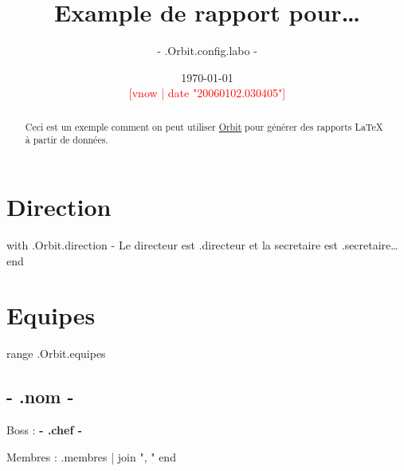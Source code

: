 \documentclass[11pt,twoside,openright]{report} %
\title{Example de rapport pour\dots}
\author{ {{- .Orbit.config.labo -}} }
\date{%
\today\\\bigskip%
\small\textcolor{red}{[v{{now | date "20060102.030405"}}]}%
}
\begin{document}
\maketitle

\begin{abstract}
  Ceci est un exemple comment on peut utiliser \href{https://github.com/gulien/orbit}{Orbit} pour générer des rapports \LaTeX{} à partir de données.
\end{abstract}



\section{Direction}

{{with .Orbit.direction -}}
  Le directeur est {{.directeur}} et la secretaire est {{.secretaire}}\dots
{{end}}

\section{Equipes}

{{range .Orbit.equipes}}
  \subsection{ {{- .nom -}} }

  Boss : \textbf{ {{- .chef -}} }

  Membres :
    {{.membres | join ", "}}
{{end}}

\end{document}
